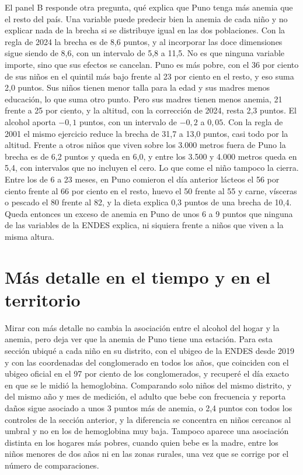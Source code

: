 \documentclass[11pt]{article}
\begin{document}
El panel B responde otra pregunta, qué explica que Puno tenga más anemia que el resto del país. Una variable puede predecir bien la anemia de cada niño y no explicar nada de la brecha si se distribuye igual en las dos poblaciones. Con la regla de 2024 la brecha es de 8,6 puntos, y al incorporar las doce dimensiones sigue siendo de 8,6, con un intervalo de 5,8 a 11,5. No es que ninguna variable importe, sino que sus efectos se cancelan. Puno es más pobre, con el 36 por ciento de sus niños en el quintil más bajo frente al 23 por ciento en el resto, y eso suma 2,0 puntos. Sus niños tienen menor talla para la edad y sus madres menos educación, lo que suma otro punto. Pero sus madres tienen menos anemia, 21 frente a 25 por ciento, y la altitud, con la corrección de 2024, resta 2,3 puntos. El alcohol aporta $-0{,}1$ puntos, con un intervalo de $-0{,}2$ a $0{,}05$. Con la regla de 2001 el mismo ejercicio reduce la brecha de 31,7 a 13,0 puntos, casi todo por la altitud. Frente a otros niños que viven sobre los 3.000 metros fuera de Puno la brecha es de 6,2 puntos y queda en 6,0, y entre los 3.500 y 4.000 metros queda en 5,4, con intervalos que no incluyen el cero. Lo que come el niño tampoco la cierra. Entre los de 6 a 23 meses, en Puno comieron el día anterior lácteos el 56 por ciento frente al 66 por ciento en el resto, huevo el 50 frente al 55 y carne, vísceras o pescado el 80 frente al 82, y la dieta explica 0,3 puntos de una brecha de 10,4. Queda entonces un exceso de anemia en Puno de unos 6 a 9 puntos que ninguna de las variables de la ENDES explica, ni siquiera frente a niños que viven a la misma altura.

\section{Más detalle en el tiempo y en el territorio}

Mirar con más detalle no cambia la asociación entre el alcohol del hogar y la anemia, pero deja ver que la anemia de Puno tiene una estación. Para esta sección ubiqué a cada niño en su distrito, con el ubigeo de la ENDES desde 2019 y con las coordenadas del conglomerado en todos los años, que coinciden con el ubigeo oficial en el 97 por ciento de los conglomerados, y recuperé el día exacto en que se le midió la hemoglobina. Comparando solo niños del mismo distrito, y del mismo año y mes de medición, el adulto que bebe con frecuencia y reporta daños sigue asociado a unos 3 puntos más de anemia, o 2,4 puntos con todos los controles de la sección anterior, y la diferencia se concentra en niños cercanos al umbral y no en los de hemoglobina muy baja. Tampoco aparece una asociación distinta en los hogares más pobres, cuando quien bebe es la madre, entre los niños menores de dos años ni en las zonas rurales, una vez que se corrige por el número de comparaciones.
\end{document}

